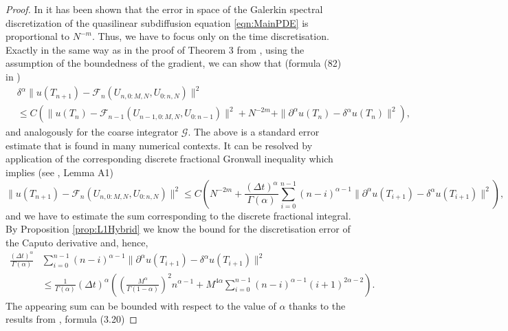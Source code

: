 \documentclass[12pt,a4paper]{article}
\begin{document}
\begin{proof}
	In \cite{plociniczak2023linear} it has been shown that the error in space of the Galerkin spectral discretization of the quasilinear subdiffusion equation \eqref{eqn:MainPDE} is proportional to $N^{-m}$. Thus, we have to focus only on the time discretisation. Exactly in the same way as in the proof of Theorem 3 from \cite{plociniczak2023linear}, using the assumption of the boundedness of the gradient, we can show that (formula (82) in \cite{plociniczak2023linear})
	\begin{equation}
		\begin{split}
			&\delta^\alpha \|u(T_{n+1}) - \mathcal{F}_n(U_{n,0:M,N}, U_{0:n,N})\|^2 \\ 
			&\leq C\left(\|u(T_{n}) - \mathcal{F}_{n-1}(U_{n-1,0:M, N}, U_{0:n-1})\|^2 + N^{-2m} + \|\partial^\alpha u(T_n) - \delta^\alpha u(T_n)\|^2\right),
		\end{split}
	\end{equation}
	and analogously for the coarse integrator $\mathcal{G}$. The above is a standard error estimate that is found in many numerical contexts. It can be resolved by application of the corresponding discrete fractional Gronwall inequality which implies (see \cite{del2025numerical}, Lemma A1)
	\begin{equation}\label{eqn:FinePropagatorError}
		\|u(T_{n+1}) - \mathcal{F}_n(U_{n,0:M,N}, U_{0:n,N})\|^2 \leq C \left(N^{-2m} + \frac{(\Delta t)^\alpha}{\Gamma(\alpha)} \sum_{i=0}^{n-1} (n-i)^{\alpha-1}  \|\partial^\alpha u(T_{i+1}) - \delta^\alpha u(T_{i+1})\|^2\right),
	\end{equation}
	and we have to estimate the sum corresponding to the discrete fractional integral. By Proposition \ref{prop:L1Hybrid} we know the bound for the discretisation error of the Caputo derivative and, hence,
	\begin{equation}
		\begin{split}
			\frac{(\Delta t)^\alpha}{\Gamma(\alpha)} &\sum_{i=0}^{n-1} (n-i)^{\alpha-1}  \|\partial^\alpha u(T_{i+1}) - \delta^\alpha u(T_{i+1})\|^2 \\
			&\leq \frac{1}{\Gamma(\alpha)} (\Delta t)^{\alpha}\left(\left(\frac{M^\alpha}{\Gamma(1-\alpha)}\right)^2 n^{\alpha-1} + M^{4\alpha}  \sum_{i=0}^{n-1} (n-i)^{\alpha-1} (i+1)^{2\alpha-2} \right).
		\end{split}
	\end{equation}
	The appearing sum can be bounded with respect to the value of $\alpha$ thanks to the results from \cite{lopez2025convolution}, formula (3.20)

\end{proof}
\end{document}
